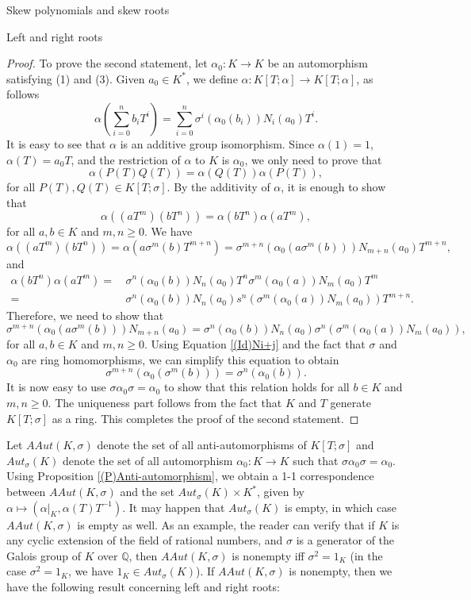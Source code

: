 \documentclass[11pt,a4paper]{article}
\theoremstyle{theorem}
\numberwithin{equation}{section}
\newcommand{\s}{\sigma}
\begin{document}
\begin{section}{Skew polynomials and skew roots}
\begin{subsection}{Left and right roots}
\begin{proof}
		To prove the second statement, let $\alpha_0:K\to K$ be an automorphism satisfying (1) and (3). Given $a_0\in K^*$, we define $\alpha:K[T;\alpha]\to K[T;\alpha]$, as follows
		$$\alpha(\sum_{i=0}^nb_iT^i)=\sum_{i=0}^n\s^i(\alpha_0(b_i))N_i(a_0)T^i.$$
		It is easy to see that $\alpha$ is an additive group isomorphism. Since $\alpha(1)=1$, $\alpha(T)=a_0T$, and the restriction of $\alpha$ to $K$ is $\alpha_0$, we only need to prove that 
		$$\alpha(P(T)Q(T))=\alpha(Q(T))\alpha(P(T)),$$
		for all $P(T),Q(T)\in K[T;\s]$. By the additivity of $\alpha$, it is enough to show that
		$$\alpha \left( (aT^m)(bT^n)\right) =\alpha \left( bT^n\right) \alpha \left( aT^m\right),$$
		for all $a,b\in K$ and $m,n\geq 0$. We have
		$$\alpha \left( (aT^m)(bT^n)\right)=\alpha \left( a\s^m(b)T^{m+n}\right) =\s^{m+n}\left( \alpha_0\left(a\s^m(b) \right) \right)N_{m+n}(a_0) T^{m+n},$$
		and
		\begin{align*}
			\alpha \left( bT^n\right) \alpha \left( aT^m\right) = & \, \s^{n}\left( \alpha_0\left(b \right) \right)N_n(a_0) T^{n}\s^{m}\left( \alpha_0\left(a\right) \right) N_m(a_0)T^{m}\\
			=&\, \s^{n}\left( \alpha_0\left(b \right) \right)N_n(a_0) s^{n}\left( \s^{m}\left( \alpha_0\left(a\right) \right) N_m(a_0)\right) T^{m+n}.
		\end{align*}
		Therefore, we need to show that
		$$
		\s^{m+n}\left( \alpha_0\left(a\s^m(b) \right) \right)N_{m+n}(a_0) =
		\s^{n}\left( \alpha_0\left(b \right) \right)N_n(a_0) \s^{n}\left( \s^{m}\left( \alpha_0\left(a\right) \right) N_m(a_0)\right),
		$$
		for all $a,b\in K$ and $m,n\geq 0$. Using Equation \ref{(Id)Ni+j} and the fact that $\s$ and $\alpha_0$ are ring homomorphisms, we can simplify this equation to obtain
		$$
		\s^{m+n}\left( \alpha_0\left(\s^m(b) \right) \right) =
		\s^{n}\left( \alpha_0\left(b \right) \right).
		$$
		It is now easy to use $\s\alpha_0 \s =\alpha_0$ to show that this relation holds for all $b\in K$ and $m,n\geq 0$. The uniqueness part follows from the fact that $K$ and $T$ generate $K[T;\s]$ as a ring. This completes the proof of the second statement. 
	\end{proof}
	Let $AAut(K,\s)$ denote the set of all anti-automorphisms of $K[T;\s]$ and $Aut_\s(K)$ denote the set of all automorphism $\alpha_0:K\to K$ such that $\s\alpha_0\s=\alpha_0$. Using Proposition \ref{(P)Anti-automorphism}, we obtain  a 1-1 correspondence between $AAut(K,\s)$ and the set $Aut_\s(K)\times K^*$, given by $\alpha\mapsto (\alpha|_{K},\alpha(T)T^{-1})$. It may happen that $Aut_\s(K)$ is empty, in which case $AAut(K,\s)$ is empty as well. As an example, the reader can verify that if $K$ is any cyclic extension of the field of rational numbers, and $\s$ is a generator of the Galois group of $K$ over $\mathbb{Q}$, then $AAut(K,\s)$  is nonempty iff $\s^2=1_K$ (in the case $\s^2=1_K$, we have $1_K\in Aut_\s(K)$). If $AAut(K,\s)$ is nonempty, then we have the following result concerning left and right roots:

\end{subsection}
\end{section}
\end{document}

